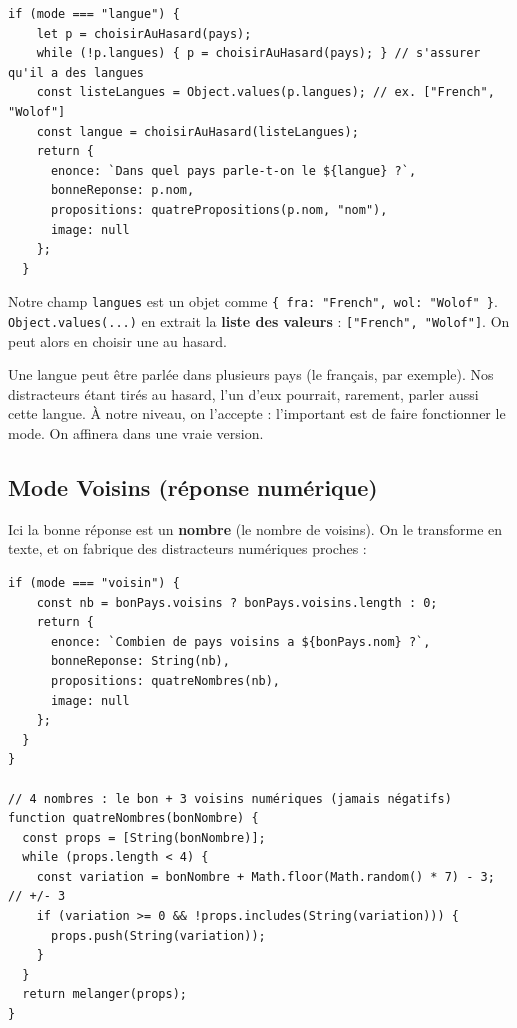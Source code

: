 \documentclass[11pt,a4paper]{article}
\newcommand{\code}[1]{\texttt{#1}}
\begin{document}
\begin{lstlisting}[style=js]
  if (mode === "langue") {
    let p = choisirAuHasard(pays);
    while (!p.langues) { p = choisirAuHasard(pays); } // s'assurer qu'il a des langues
    const listeLangues = Object.values(p.langues); // ex. ["French", "Wolof"]
    const langue = choisirAuHasard(listeLangues);
    return {
      enonce: `Dans quel pays parle-t-on le ${langue} ?`,
      bonneReponse: p.nom,
      propositions: quatrePropositions(p.nom, "nom"),
      image: null
    };
  }
\end{lstlisting}

\begin{infobox}
Notre champ \code{langues} est un objet comme \code{\{ fra: "French", wol: "Wolof" \}}. \code{Object.values(...)} en extrait la \textbf{liste des valeurs} : \code{["French", "Wolof"]}. On peut alors en choisir une au hasard.
\end{infobox}

\begin{attentionbox}
Une langue peut être parlée dans plusieurs pays (le français, par exemple). Nos distracteurs étant tirés au hasard, l'un d'eux pourrait, rarement, parler aussi cette langue. À notre niveau, on l'accepte : l'important est de faire fonctionner le mode. On affinera dans une vraie version.
\end{attentionbox}

\subsection{Mode Voisins (réponse numérique)}
Ici la bonne réponse est un \textbf{nombre} (le nombre de voisins). On le transforme en texte, et on fabrique des distracteurs numériques proches :

\begin{lstlisting}[style=js]
  if (mode === "voisin") {
    const nb = bonPays.voisins ? bonPays.voisins.length : 0;
    return {
      enonce: `Combien de pays voisins a ${bonPays.nom} ?`,
      bonneReponse: String(nb),
      propositions: quatreNombres(nb),
      image: null
    };
  }
}

// 4 nombres : le bon + 3 voisins numériques (jamais négatifs)
function quatreNombres(bonNombre) {
  const props = [String(bonNombre)];
  while (props.length < 4) {
    const variation = bonNombre + Math.floor(Math.random() * 7) - 3; // +/- 3
    if (variation >= 0 && !props.includes(String(variation))) {
      props.push(String(variation));
    }
  }
  return melanger(props);
}
\end{lstlisting}
\end{document}
